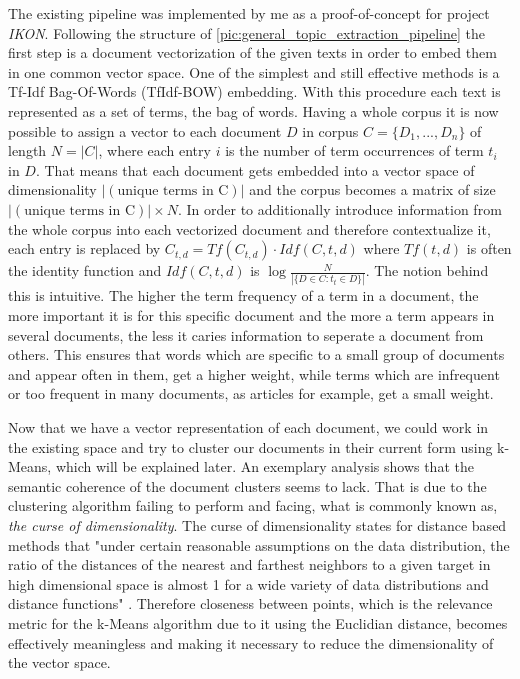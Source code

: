 The existing pipeline was implemented by me as a proof-of-concept for project \textit{IKON}. Following the structure of \autoref{pic:general_topic_extraction_pipeline} the first step is a document vectorization of the given texts in order to embed them in one common vector space. One of the simplest and still effective methods is a Tf-Idf Bag-Of-Words (TfIdf-BOW) embedding. With this procedure each text is represented as a set of terms, the bag of words. Having a whole corpus it is now possible to assign a vector to each document $D$ in corpus $C=\{D_1, ..., D_n\}$ of length $N = |C|$, where each entry $i$ is the number of term occurrences of term $t_i$ in $D$. That means that each document gets embedded into a vector space of dimensionality $|(\text{unique terms in C})|$ and the corpus becomes a matrix of size $|(\text{unique terms in C})| \times N$. In order to additionally introduce information from the whole corpus into each vectorized document and therefore contextualize it, each entry is replaced by $C_{t,d}=Tf(C_{t,d}) \cdot Idf(C,t,d)$ where $Tf(t,d)$ is often the identity function and $Idf(C,t,d)$ is $\log\frac{N}{|\{ D \in C : t_t \in D \}|}$. \cite{PivotedDocumentLength} The notion behind this is intuitive. The higher the term frequency of a term in a document, the more important it is for this specific document and the more a term appears in several documents, the less it caries information to seperate a document from others.  This ensures that words which are specific to a small group of documents and appear often in them, get a higher weight, while terms which are infrequent or too frequent in many documents, as articles for example, get a small weight.

Now that we have a vector representation of each document, we could work in the existing space and try to cluster our documents in their current form using k-Means, which will be explained later. An exemplary analysis shows that the semantic coherence of the document clusters seems to lack.  That is due to the clustering algorithm failing to perform and facing, what is commonly known as, \textit{the curse of dimensionality}. The curse of dimensionality states for distance based methods that "under certain reasonable assumptions on the
data distribution, the ratio of the distances of the nearest and farthest neighbors
to a given target in high dimensional space is almost 1 for a wide variety of data
distributions and distance functions" \cite{aggarwalSurprisingBehaviorDistance2001}. Therefore closeness between points, which is the relevance metric for the k-Means algorithm due to it using the Euclidian distance, becomes effectively meaningless and making it necessary to reduce the dimensionality of the vector space.

